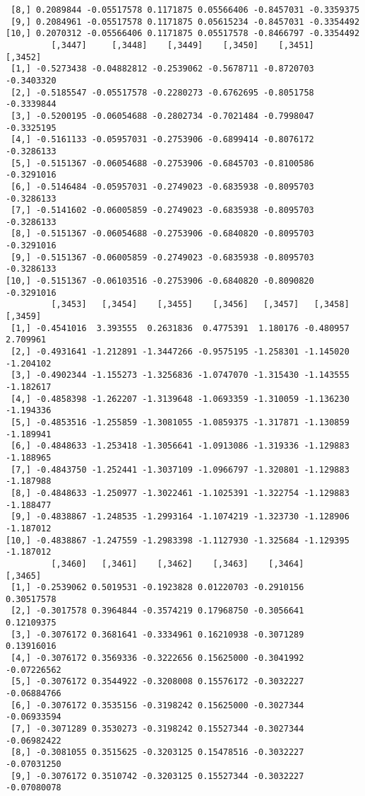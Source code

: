 \documentclass[
  letterpaper,
  DIV=11,
  numbers=noendperiod]{scrreprt}
\begin{document}
\begin{verbatim}
 [8,] 0.2089844 -0.05517578 0.1171875 0.05566406 -0.8457031 -0.3359375
 [9,] 0.2084961 -0.05517578 0.1171875 0.05615234 -0.8457031 -0.3354492
[10,] 0.2070312 -0.05566406 0.1171875 0.05517578 -0.8466797 -0.3354492
         [,3447]     [,3448]    [,3449]    [,3450]    [,3451]    [,3452]
 [1,] -0.5273438 -0.04882812 -0.2539062 -0.5678711 -0.8720703 -0.3403320
 [2,] -0.5185547 -0.05517578 -0.2280273 -0.6762695 -0.8051758 -0.3339844
 [3,] -0.5200195 -0.06054688 -0.2802734 -0.7021484 -0.7998047 -0.3325195
 [4,] -0.5161133 -0.05957031 -0.2753906 -0.6899414 -0.8076172 -0.3286133
 [5,] -0.5151367 -0.06054688 -0.2753906 -0.6845703 -0.8100586 -0.3291016
 [6,] -0.5146484 -0.05957031 -0.2749023 -0.6835938 -0.8095703 -0.3286133
 [7,] -0.5141602 -0.06005859 -0.2749023 -0.6835938 -0.8095703 -0.3286133
 [8,] -0.5151367 -0.06054688 -0.2753906 -0.6840820 -0.8095703 -0.3291016
 [9,] -0.5151367 -0.06005859 -0.2749023 -0.6835938 -0.8095703 -0.3286133
[10,] -0.5151367 -0.06103516 -0.2753906 -0.6840820 -0.8090820 -0.3291016
         [,3453]   [,3454]    [,3455]    [,3456]   [,3457]   [,3458]   [,3459]
 [1,] -0.4541016  3.393555  0.2631836  0.4775391  1.180176 -0.480957  2.709961
 [2,] -0.4931641 -1.212891 -1.3447266 -0.9575195 -1.258301 -1.145020 -1.204102
 [3,] -0.4902344 -1.155273 -1.3256836 -1.0747070 -1.315430 -1.143555 -1.182617
 [4,] -0.4858398 -1.262207 -1.3139648 -1.0693359 -1.310059 -1.136230 -1.194336
 [5,] -0.4853516 -1.255859 -1.3081055 -1.0859375 -1.317871 -1.130859 -1.189941
 [6,] -0.4848633 -1.253418 -1.3056641 -1.0913086 -1.319336 -1.129883 -1.188965
 [7,] -0.4843750 -1.252441 -1.3037109 -1.0966797 -1.320801 -1.129883 -1.187988
 [8,] -0.4848633 -1.250977 -1.3022461 -1.1025391 -1.322754 -1.129883 -1.188477
 [9,] -0.4838867 -1.248535 -1.2993164 -1.1074219 -1.323730 -1.128906 -1.187012
[10,] -0.4838867 -1.247559 -1.2983398 -1.1127930 -1.325684 -1.129395 -1.187012
         [,3460]   [,3461]    [,3462]    [,3463]    [,3464]     [,3465]
 [1,] -0.2539062 0.5019531 -0.1923828 0.01220703 -0.2910156  0.30517578
 [2,] -0.3017578 0.3964844 -0.3574219 0.17968750 -0.3056641  0.12109375
 [3,] -0.3076172 0.3681641 -0.3334961 0.16210938 -0.3071289  0.13916016
 [4,] -0.3076172 0.3569336 -0.3222656 0.15625000 -0.3041992 -0.07226562
 [5,] -0.3076172 0.3544922 -0.3208008 0.15576172 -0.3032227 -0.06884766
 [6,] -0.3076172 0.3535156 -0.3198242 0.15625000 -0.3027344 -0.06933594
 [7,] -0.3071289 0.3530273 -0.3198242 0.15527344 -0.3027344 -0.06982422
 [8,] -0.3081055 0.3515625 -0.3203125 0.15478516 -0.3032227 -0.07031250
 [9,] -0.3076172 0.3510742 -0.3203125 0.15527344 -0.3032227 -0.07080078

\end{verbatim}
\end{document}
